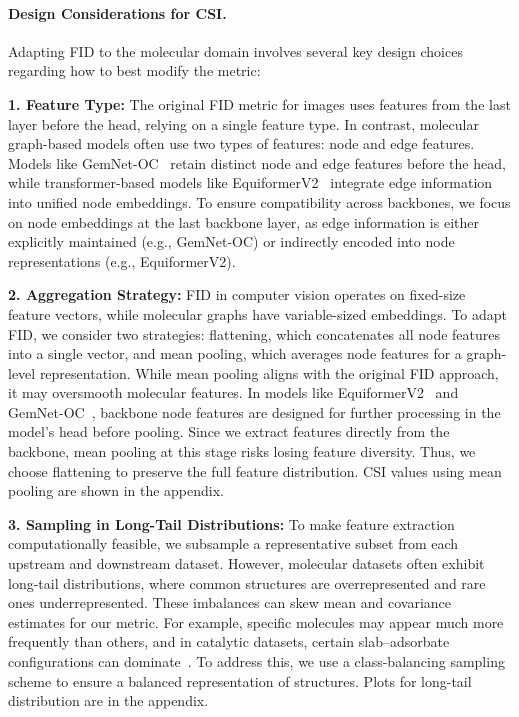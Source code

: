 

\paragraph{Design Considerations for CSI.} 
Adapting FID to the molecular domain involves several key design choices regarding how to best modify the metric:

\hspace{1em}\textbf{1. Feature Type:} The original FID metric for images uses features from the last layer before the head, relying on a single feature type. In contrast, molecular graph-based models often use two types of features: node and edge features. Models like GemNet-OC~\cite{gasteiger2022gemnet} retain distinct node and edge features before the head, while transformer-based models like EquiformerV2~\cite{liaoequiformerv2} integrate edge information into unified node embeddings. To ensure compatibility across backbones, we focus on node embeddings at the last backbone layer, as edge information is either explicitly maintained (e.g., GemNet-OC) or indirectly encoded into node representations (e.g., EquiformerV2).

\hspace{1em}\textbf{2. Aggregation Strategy:} FID in computer vision operates on fixed-size feature vectors, while molecular graphs have variable-sized embeddings. To adapt FID, we consider two strategies: flattening, which concatenates all node features into a single vector, and mean pooling, which averages node features for a graph-level representation. While mean pooling aligns with the original FID approach, it may oversmooth molecular features. In models like EquiformerV2~\cite{liaoequiformerv2} and GemNet-OC~\cite{gasteiger2022gemnet}, backbone node features are designed for further processing in the model's head before pooling. Since we extract features directly from the backbone, mean pooling at this stage risks losing feature diversity. Thus, we choose flattening to preserve the full feature distribution. CSI values using mean pooling are shown in the appendix.


\hspace{1em}\textbf{3. Sampling in Long-Tail Distributions:} To make feature extraction computationally feasible, we subsample a representative subset from each upstream and downstream dataset. However, molecular datasets often exhibit long-tail distributions, where common structures are overrepresented and rare ones underrepresented. These imbalances can skew mean and covariance estimates for our metric. For example, specific molecules may appear much more frequently than others, and in catalytic datasets, certain slab–adsorbate configurations can dominate~\cite{chanussot2021open}. To address this, we use a class-balancing sampling scheme to ensure a balanced representation of structures. Plots for long-tail distribution are in the appendix.


